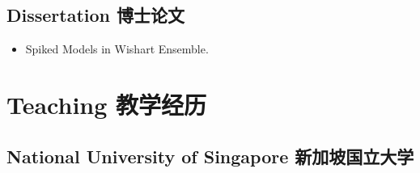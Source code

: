 \documentclass[12pt,a4paper]{article}
\begin{document}
\subsection*{Dissertation 博士论文}
\begin{itemize}
\item
  Spiked Models in Wishart Ensemble.
\end{itemize}

\section*{Teaching 教学经历}

\subsection*{National University of Singapore 新加坡国立大学}
\end{document}
